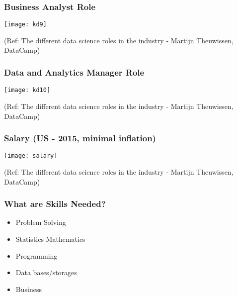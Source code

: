 \begin{frame}[fragile]\frametitle{Business Analyst Role}

\begin{center}
\texttt{[image: kd9]}
\end{center}

{\tiny (Ref: The different data science roles in the industry - Martijn Theuwissen, DataCamp)}
\end{frame}

\begin{frame}[fragile]\frametitle{Data and Analytics Manager Role}

\begin{center}
\texttt{[image: kd10]}
\end{center}

{\tiny (Ref: The different data science roles in the industry - Martijn Theuwissen, DataCamp)}
\end{frame}


\begin{frame}[fragile]\frametitle{Salary (US - 2015, minimal inflation)}

\begin{center}
\texttt{[image: salary]}
\end{center}

{\tiny (Ref: The different data science roles in the industry - Martijn Theuwissen, DataCamp)}
\end{frame}

\begin{frame}[fragile]\frametitle{What are Skills Needed?}
\begin{itemize}
\item Problem Solving
\item Statistics Mathematics
\item Programming
\item Data bases/storages
\item Business
\end{itemize}
\end{frame}


